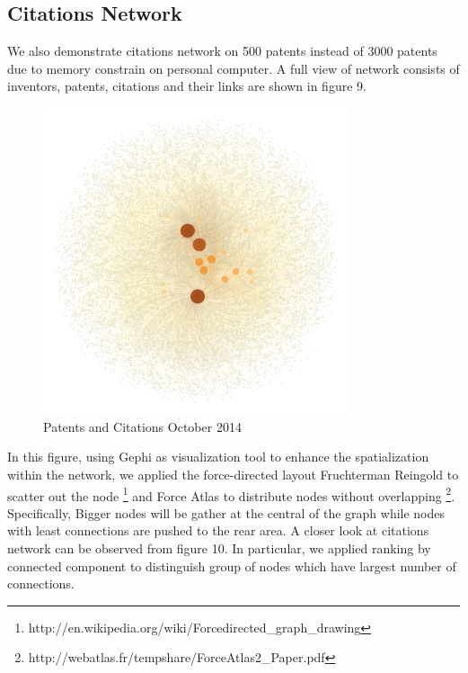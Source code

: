 \documentclass{sig-alternate}
\begin{document}
{\subsection{Citations Network}

We also demonstrate citations network on 500 patents instead of 3000 patents due to memory constrain on personal computer. A full view of network consists of inventors, patents, citations and their links are shown in figure 9. 
\begin{figure}[htb]
\centering
\includegraphics[width=90mm]{citation.png}
\caption{ Patents and Citations October 2014 }
\end{figure}

In this figure, using Gephi as visualization tool to enhance the spatialization within the network, we applied the force-directed layout Fruchterman Reingold to scatter out the node \footnote{http://en.wikipedia.org/wiki/Force\-directed\_graph\_drawing} and Force Atlas to distribute nodes without overlapping \footnote{http://webatlas.fr/tempshare/ForceAtlas2\_Paper.pdf}. Specifically, Bigger nodes will be gather at the central of the graph while nodes with least connections are pushed to the rear area. A closer look at citations network can be observed from figure 10. In particular, we applied ranking by connected component to distinguish group of nodes which have largest number of connections.

}
\end{document}
